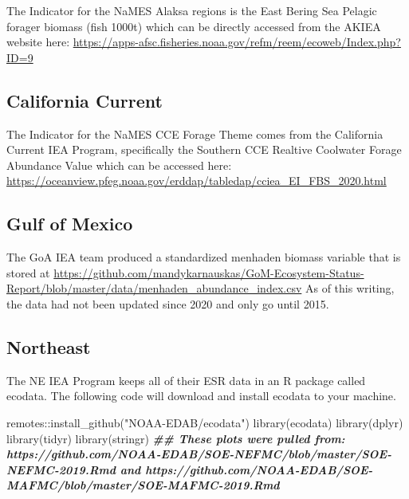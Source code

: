 \documentclass[
]{book}
\newenvironment{Shaded}{\begin{snugshade}}{\end{snugshade}}
\newcommand{\DocumentationTok}[1]{\textcolor[rgb]{0.56,0.35,0.01}{\textbf{\textit{#1}}}}
\newcommand{\FunctionTok}[1]{\textcolor[rgb]{0.00,0.00,0.00}{#1}}
\newcommand{\NormalTok}[1]{#1}
\newcommand{\SpecialCharTok}[1]{\textcolor[rgb]{0.00,0.00,0.00}{#1}}
\newcommand{\StringTok}[1]{\textcolor[rgb]{0.31,0.60,0.02}{#1}}
\begin{document}
The Indicator for the NaMES Alaksa regions is the East Bering Sea Pelagic forager biomass (fish 1000t) which can be directly accessed from the AKIEA website here: \url{https://apps-afsc.fisheries.noaa.gov/refm/reem/ecoweb/Index.php?ID=9}

\hypertarget{california-current}{%
\subsection{California Current}\label{california-current}}

The Indicator for the NaMES CCE Forage Theme comes from the California Current IEA Program, specifically the Southern CCE Realtive Coolwater Forage Abundance Value which can be accessed here: \url{https://oceanview.pfeg.noaa.gov/erddap/tabledap/cciea_EI_FBS_2020.html}

\hypertarget{gulf-of-mexico}{%
\subsection{Gulf of Mexico}\label{gulf-of-mexico}}

The GoA IEA team produced a standardized menhaden biomass variable that is stored at \url{https://github.com/mandykarnauskas/GoM-Ecosystem-Status-Report/blob/master/data/menhaden_abundance_index.csv} As of this writing, the data had not been updated since 2020 and only go until 2015.

\hypertarget{northeast}{%
\subsection{Northeast}\label{northeast}}

The NE IEA Program keeps all of their ESR data in an R package called ecodata. The following code will download and install ecodata to your machine.

\begin{Shaded}
\begin{Highlighting}[]
\NormalTok{remotes}\SpecialCharTok{::}\FunctionTok{install\_github}\NormalTok{(}\StringTok{"NOAA{-}EDAB/ecodata"}\NormalTok{)}
\FunctionTok{library}\NormalTok{(ecodata)}
\FunctionTok{library}\NormalTok{(dplyr)}
\FunctionTok{library}\NormalTok{(tidyr)}
\FunctionTok{library}\NormalTok{(stringr)}
\DocumentationTok{\#\# These plots were pulled from: https://github.com/NOAA{-}EDAB/SOE{-}NEFMC/blob/master/SOE{-}NEFMC{-}2019.Rmd and https://github.com/NOAA{-}EDAB/SOE{-}MAFMC/blob/master/SOE{-}MAFMC{-}2019.Rmd}
\end{Highlighting}
\end{Shaded}
\end{document}

